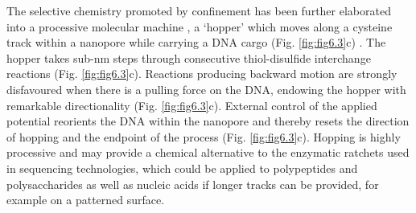 The selective chemistry promoted by confinement has been further elaborated into a processive molecular machine \cite{Astumian2012}, a ‘hopper’ which moves along a cysteine track within a nanopore while carrying a DNA cargo (Fig. \ref{fig:fig6.3}c) \cite{Qing2018a}. The hopper takes sub-nm steps through consecutive thiol-disulfide interchange reactions (Fig. \ref{fig:fig6.3}c). Reactions producing backward motion are strongly disfavoured when there is a pulling force on the DNA, endowing the hopper with remarkable directionality (Fig. \ref{fig:fig6.3}c). External control of the applied potential reorients the DNA within the nanopore and thereby resets the direction of hopping and the endpoint of the process (Fig. \ref{fig:fig6.3}c). Hopping is highly processive \cite{Qing2018a} and may provide a chemical alternative to the enzymatic ratchets used in sequencing technologies, which could be applied to polypeptides and polysaccharides as well as nucleic acids if longer tracks can be provided, for example on a patterned surface.


